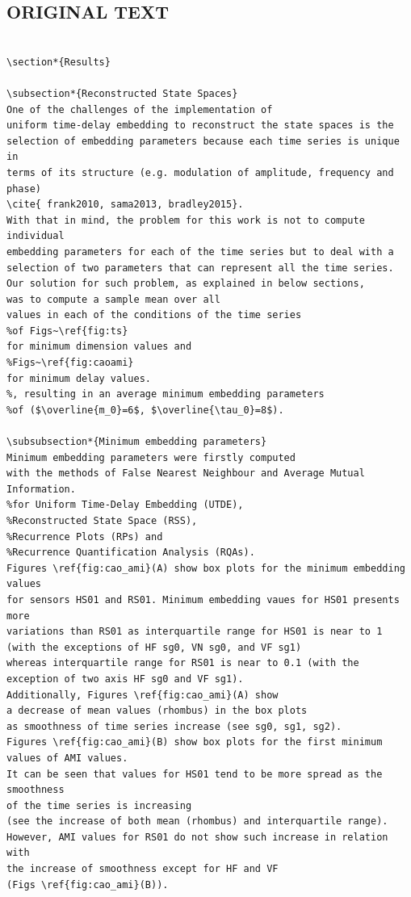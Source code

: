 \documentclass[10pt]{article}
\begin{document}
\subsection{ORIGINAL TEXT}
\begin{verbatim}

\section*{Results}

\subsection*{Reconstructed State Spaces}
One of the challenges of the implementation of 
uniform time-delay embedding to reconstruct the state spaces is the 
selection of embedding parameters because each time series is unique in 
terms of its structure (e.g. modulation of amplitude, frequency and phase) 
\cite{ frank2010, sama2013, bradley2015}.
With that in mind, the problem for this work is not to compute individual 
embedding parameters for each of the time series but to deal with a 
selection of two parameters that can represent all the time series. 
Our solution for such problem, as explained in below sections, 
was to compute a sample mean over all 
values in each of the conditions of the time series 
%of Figs~\ref{fig:ts}
for minimum dimension values and 
%Figs~\ref{fig:caoami} 
for minimum delay values.
%, resulting in an average minimum embedding parameters 
%of ($\overline{m_0}=6$, $\overline{\tau_0}=8$).

\subsubsection*{Minimum embedding parameters}
Minimum embedding parameters were firstly computed 
with the methods of False Nearest Neighbour and Average Mutual Information.
%for Uniform Time-Delay Embedding (UTDE),
%Reconstructed State Space (RSS), 
%Recurrence Plots (RPs) and 
%Recurrence Quantification Analysis (RQAs).
Figures \ref{fig:cao_ami}(A) show box plots for the minimum embedding values 
for sensors HS01 and RS01. Minimum embedding vaues for HS01 presents more 
variations than RS01 as interquartile range for HS01 is near to 1 (with the exceptions of HF sg0, VN sg0, and VF sg1)
whereas interquartile range for RS01 is near to 0.1 (with the exception of two axis HF sg0 and VF sg1).
Additionally, Figures \ref{fig:cao_ami}(A) show
a decrease of mean values (rhombus) in the box plots
as smoothness of time series increase (see sg0, sg1, sg2).
Figures \ref{fig:cao_ami}(B) show box plots for the first minimum values of AMI values.
It can be seen that values for HS01 tend to be more spread as the smoothness 
of the time series is increasing 
(see the increase of both mean (rhombus) and interquartile range).
However, AMI values for RS01 do not show such increase in relation with
the increase of smoothness except for HF and VF
(Figs \ref{fig:cao_ami}(B)).


\end{verbatim}
\end{document}
